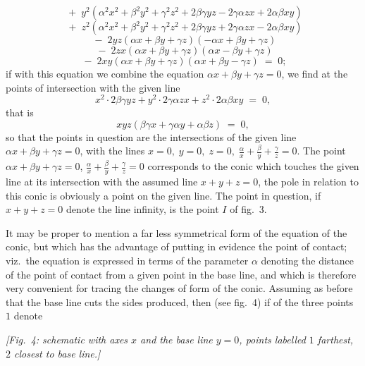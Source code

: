 \documentclass[11pt,a4paper]{article}
\begin{document}
\[
\;+\; y^2(\alpha^2 x^2 + \beta^2 y^2 + \gamma^2 z^2 + 2\beta\gamma yz - 2\gamma\alpha zx + 2\alpha\beta xy)
\]
\[
\;+\; z^2(\alpha^2 x^2 + \beta^2 y^2 + \gamma^2 z^2 + 2\beta\gamma yz + 2\gamma\alpha zx - 2\alpha\beta xy)
\]
\[
\;-\; 2yz(\alpha x + \beta y + \gamma z)(-\alpha x + \beta y + \gamma z)
\]
\[
\;-\; 2zx(\alpha x + \beta y + \gamma z)(\alpha x - \beta y + \gamma z)
\]
\[
\;-\; 2xy(\alpha x + \beta y + \gamma z)(\alpha x + \beta y - \gamma z) \;=\; 0;
\]
if with this equation we combine the equation $\alpha x + \beta y + \gamma z = 0$, we find at the points of intersection with the given line
\[
x^2\cdot 2\beta\gamma yz + y^2\cdot 2\gamma\alpha zx + z^2\cdot 2\alpha\beta xy \;=\; 0,
\]
that is
\[
xyz(\beta\gamma x + \gamma\alpha y + \alpha\beta z) \;=\; 0,
\]
so that the points in question are the intersections of the given line $\alpha x + \beta y + \gamma z = 0$, with the lines $x = 0,\;y = 0,\;z = 0,\;\tfrac{\alpha}{x} + \tfrac{\beta}{y} + \tfrac{\gamma}{z} = 0$. The point $\alpha x + \beta y + \gamma z = 0$, $\tfrac{\alpha}{x} + \tfrac{\beta}{y} + \tfrac{\gamma}{z} = 0$ corresponds to the conic which touches the given line at its intersection with the assumed line $x + y + z = 0$, the pole in relation to this conic is obviously a point on the given line. The point in question, if $x + y + z = 0$ denote the line infinity, is the point $I$ of fig.~3.

\medskip

It may be proper to mention a far less symmetrical form of the equation of the conic, but which has the advantage of putting in evidence the point of contact; viz.\ the equation is expressed in terms of the parameter $\alpha$ denoting the distance of the point of contact from a given point in the base line, and which is therefore very convenient for tracing the changes of form of the conic. Assuming as before that the base line cuts the sides produced, then (see fig.~4) if of the three points $1$ denote

\begin{center}\textit{[Fig.~4: schematic with axes $x$ and the base line $y = 0$, points labelled $1$ farthest, $2$ closest to base line.]}\end{center}
\end{document}
